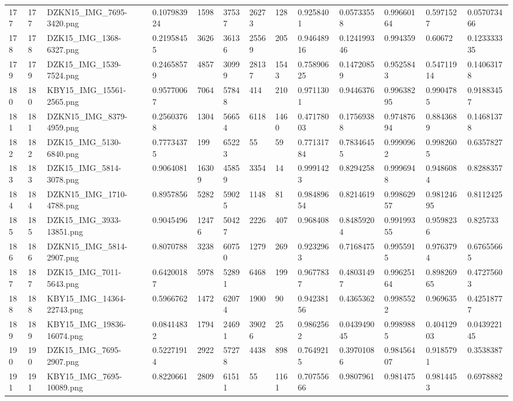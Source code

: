 \documentclass[11pt, a4paper, twoside]{report}
\begin{document}
\begin{longtable}[c]{@{}lllllllllllll@{}}
177 & 177 & DZKN15\_IMG\_7695-3420.png & 0.107983924 & 1598 & 37537 & 26273 & 128 & 0.9258401 & 0.05733558 & 0.99660164 & 0.5971527 & 0.057073466 \\
178 & 178 & DZK15\_IMG\_1368-6327.png & 0.21958455 & 3626 & 36136 & 25569 & 205 & 0.94648916 & 0.124199346 & 0.994359 & 0.60672 & 0.123333335 \\
179 & 179 & DZK15\_IMG\_1539-7524.png & 0.24658579 & 4857 & 30999 & 28137 & 1543 & 0.75890625 & 0.14720859 & 0.9525843 & 0.54711914 & 0.14063178 \\
180 & 180 & KBY15\_IMG\_15561-2565.png & 0.95770067 & 7064 & 57848 & 414 & 210 & 0.9711301 & 0.9446376 & 0.99638295 & 0.9904785 & 0.91883457 \\
181 & 181 & DZKN15\_IMG\_8379-4959.png & 0.25603768 & 1304 & 56654 & 6118 & 1460 & 0.47178003 & 0.17569388 & 0.97487694 & 0.8843689 & 0.14681378 \\
182 & 182 & DZK15\_IMG\_5130-6840.png & 0.77734375 & 199 & 65223 & 55 & 59 & 0.77131784 & 0.78346455 & 0.9990962 & 0.9982605 & 0.6357827 \\
183 & 183 & DZK15\_IMG\_5814-3078.png & 0.9064081 & 16309 & 45859 & 3354 & 14 & 0.9991423 & 0.8294258 & 0.9996948 & 0.9486084 & 0.8288357 \\
184 & 184 & DZKN15\_IMG\_1710-4788.png & 0.8957856 & 5282 & 59025 & 1148 & 81 & 0.98489654 & 0.8214619 & 0.99862957 & 0.98124695 & 0.8112425 \\
185 & 185 & DZK15\_IMG\_3933-13851.png & 0.9045496 & 12476 & 50427 & 2226 & 407 & 0.968408 & 0.84859204 & 0.99199355 & 0.9598236 & 0.825733 \\
186 & 186 & DZKN15\_IMG\_5814-2907.png & 0.8070788 & 3238 & 60750 & 1279 & 269 & 0.9232963 & 0.7168475 & 0.9955915 & 0.9763794 & 0.67655665 \\
187 & 187 & DZK15\_IMG\_7011-5643.png & 0.64200187 & 5978 & 52891 & 6468 & 199 & 0.9677837 & 0.48031497 & 0.99625164 & 0.89826965 & 0.47275603 \\
188 & 188 & KBY15\_IMG\_14364-22743.png & 0.5966762 & 1472 & 62074 & 1900 & 90 & 0.94238156 & 0.4365362 & 0.9985522 & 0.969635 & 0.42518777 \\
189 & 189 & KBY15\_IMG\_19836-16074.png & 0.08414832 & 1794 & 24691 & 39026 & 25 & 0.9862562 & 0.043949045 & 0.9989885 & 0.40412903 & 0.043922145 \\
190 & 190 & DZK15\_IMG\_7695-2907.png & 0.52271914 & 2922 & 57278 & 4438 & 898 & 0.7649215 & 0.39701086 & 0.98456407 & 0.9185791 & 0.3538387 \\
191 & 191 & KBY15\_IMG\_7695-10089.png & 0.8220661 & 2809 & 61511 & 55 & 1161 & 0.70755666 & 0.9807961 & 0.981475 & 0.9814453 & 0.6978882 \\

\end{longtable}
\end{document}
